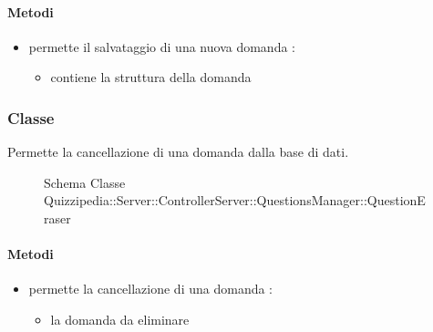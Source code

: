 \paragraph{Metodi}
\begin{itemize}
\item {}
\newline
permette il salvataggio di una nuova domanda
\newline
{} :
\begin{itemize}
\item {}
\newline
contiene la struttura della domanda
\end{itemize}
\end{itemize}
\subsubsection{Classe }
Permette la cancellazione di una domanda dalla base di dati.
\begin{figure}[H]
\centering
\noindent{}
\caption[Schema Classe QuestionEraser]{Schema Classe Quizzipedia::Server::ControllerServer::QuestionsManager::QuestionEraser}
\end{figure}
\paragraph{Metodi}
\begin{itemize}
\item {}
\newline
permette la cancellazione di una domanda
\newline
{} :
\begin{itemize}
\item {}
\newline
la domanda da eliminare
\end{itemize}
\end{itemize}
